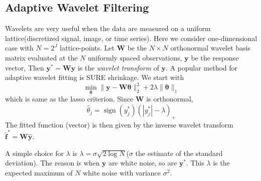 \subsection{Adaptive Wavelet Filtering}
Wavelets are very useful when the data are measured on a uniform lattice(discretized signal, 
image, or time series). Here we consider one-dimensional case with $N=2^J$ lattice-points. 
Let $\mathbf{W}$ be the $N\times N$ orthonormal wavelet basis matrix evaluated at the $N$ 
uniformly spaced observations, $\mathbf{y}$ be the response vector, Then $\mathbf{y}^*=
\mathbf{W}\mathbf{y}$ is the \textit{wavelet transform} of $\mathbf{y}$. A popular method for 
adaptive wavelet fitting is SURE shrinkage. We start with
\begin{equation*}
    \min _{\boldsymbol{\theta}}\|\mathbf{y}-\mathbf{W} \boldsymbol{\theta}\|_{2}^{2}+2 
    \lambda\|\boldsymbol{\theta}\|_{1}
\end{equation*}
which is same as the lasso criterion. Since $\mathbf{W}$ is orthonormal, 
\begin{equation*}
    \hat{\theta}_{j}=\operatorname{sign}\left(y_{j}^{*}\right)
    \left(\left|y_{j}^{*}\right|-\lambda\right)_{+}
\end{equation*}
The fitted function (vector) is then given by the inverse wavelet transform $\hat{\mathbf{f}}^*=
\mathbf{W}\hat{\mathbf{y}}$. 

A simple choice for $\lambda$ is $\lambda=\sigma \sqrt{2 \log N}$($\sigma$ the estimate of the 
standard deviation). The reason is when $\mathbf{y}$ are white noise, so are $\mathbf{y}^*$. 
This $\lambda$ is the expected maximum of $N$ white noise with variance $\sigma^2$. 


